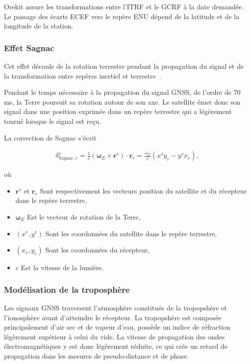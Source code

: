 Orekit assure les transformations entre l'ITRF et le GCRF à la date demandée.
Le passage des écarts ECEF vers le repère ENU dépend de la
latitude et de la longitude de la station.

\subsubsection{Effet Sagnac}\label{sagnac}

Cet effet découle de la rotation terrestre pendant la propagation du signal et
de la transformation entre repères inertiel et terrestre~\cite{ashby2003}.

Pendant le temps nécessaire à la propagation du signal GNSS, de l'ordre de 70 ms, la Terre poursuit sa rotation autour de son axe. Le satellite émet donc son signal dans une position exprimée dans un repère terrestre qui a légèrement tourné lorsque le signal est reçu.

La correction de Sagnac s'écrit

\begin{align}
\delta_{\mathrm{Sagnac},r}^s
=
\frac{1}{c} (\boldsymbol\omega_E \times \mathbf r^s)\cdot\mathbf r_r
=
\frac{\omega_E}{c}
\left(
x^s y_r
-
y^s x_r
\right),
\end{align}

où

\begin{itemize}
    \item $\mathbf r^s$ et $\mathbf r_r$ Sont respectivement les vecteurs position du satellite et du récepteur dans le repère terrestre,
    \item $\boldsymbol\omega_E$ Est le vecteur de rotation de la Terre,
    \item $(x^s,y^s)$ Sont les coordonnées du satellite dans le repère terrestre,
    \item $(x_r,y_r)$ Sont les coordonnées du récepteur,
    \item $c$ Est la vitesse de la lumière.
\end{itemize}

\subsubsection{Modélisation de la troposphère}

Les signaux GNSS traversent l'atmosphère constituée de la tropopshère et l'ionosphère avant d'atteindre le récepteur. 
La tropopshère est composée principalement d'air sec et de vapeur d'eau, 
possède un indice de réfraction légèrement supérieur à celui du vide.
La vitesse de propagation des ondes électromagnétiques y est donc légèrement
réduite, ce qui crée un retard de propagation dans
les mesures de pseudo-distance et de phase.

